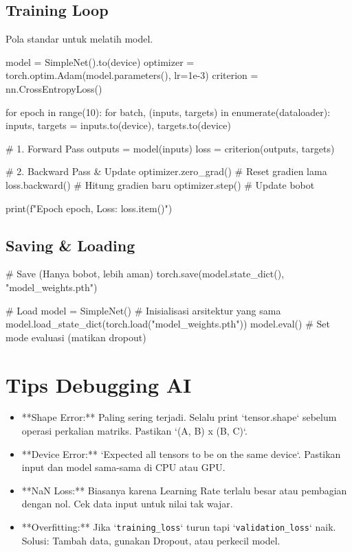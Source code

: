 \subsection{Training Loop}
Pola standar untuk melatih model.

\begin{codeblock}[language=Python]
model = SimpleNet().to(device)
optimizer = torch.optim.Adam(model.parameters(), lr=1e-3)
criterion = nn.CrossEntropyLoss()

for epoch in range(10):
    for batch, (inputs, targets) in enumerate(dataloader):
        inputs, targets = inputs.to(device), targets.to(device)

        # 1. Forward Pass
        outputs = model(inputs)
        loss = criterion(outputs, targets)

        # 2. Backward Pass & Update
        optimizer.zero_grad() # Reset gradien lama
        loss.backward()       # Hitung gradien baru
        optimizer.step()      # Update bobot

    print(f"Epoch {epoch}, Loss: {loss.item()}")
\end{codeblock}

\subsection{Saving \& Loading}
\begin{codeblock}[language=Python]
# Save (Hanya bobot, lebih aman)
torch.save(model.state_dict(), "model_weights.pth")

# Load
model = SimpleNet() # Inisialisasi arsitektur yang sama
model.load_state_dict(torch.load("model_weights.pth"))
model.eval() # Set mode evaluasi (matikan dropout)
\end{codeblock}

\section{Tips Debugging AI}

\begin{itemize}
    \item **Shape Error:** Paling sering terjadi. Selalu print `tensor.shape` sebelum operasi perkalian matriks. Pastikan `(A, B) x (B, C)`.
    \item **Device Error:** `Expected all tensors to be on the same device`. Pastikan input dan model sama-sama di CPU atau GPU.
    \item **NaN Loss:** Biasanya karena Learning Rate terlalu besar atau pembagian dengan nol. Cek data input untuk nilai tak wajar.
    \item **Overfitting:** Jika `\texttt{training\_loss}` turun tapi `\texttt{validation\_loss}` naik. Solusi: Tambah data, gunakan Dropout, atau perkecil model.
\end{itemize}
